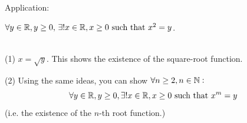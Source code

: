 \documentclass[10pt]{scrartcl}
\begin{document}
Application: 
\begin{theorem}
$\forall y \in\mathbb{R}, y \geq 0,\,\exists! x \in\mathbb{R}, x \geq 0\text{ such that }x^2 =y$.
\end{theorem}\vspace*{5pt}

\begin{remark}~\\[-0.5cm]

(1) $x = \sqrt{y}$. This shows the existence of the square-root function.

(2) Using the same ideas, you can show $\forall n \geq 2, n \in\mathbb{N}:$
\[\forall y\in\mathbb{R}, y\geq 0, \exists! x \in\mathbb{R}, x\geq 0 \text{ such that } x^m = y\]	
(i.e. the existence of the $n$-th root function.)
\end{remark}
\end{document}
